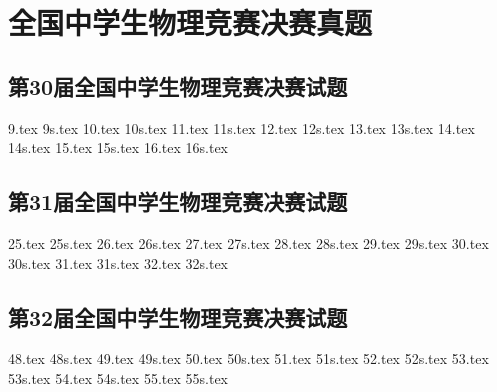\chapter{全国中学生物理竞赛决赛真题}
\section{第30届全国中学生物理竞赛决赛试题}
{9.tex}
{9s.tex}
{10.tex}
{10s.tex}
{11.tex}
{11s.tex}
{12.tex}
{12s.tex}
{13.tex}
{13s.tex}
{14.tex}
{14s.tex}
{15.tex}
{15s.tex}
{16.tex}
{16s.tex}
\newpage
\section{第31届全国中学生物理竞赛决赛试题}
{25.tex}
{25s.tex}
{26.tex}
{26s.tex}
{27.tex}
{27s.tex}
{28.tex}
{28s.tex}
{29.tex}
{29s.tex}
{30.tex}
{30s.tex}
{31.tex}
{31s.tex}
{32.tex}
{32s.tex}
\newpage
\section{第32届全国中学生物理竞赛决赛试题}
{48.tex}
{48s.tex}
{49.tex}
{49s.tex}
{50.tex}
{50s.tex}
{51.tex}
{51s.tex}
{52.tex}
{52s.tex}
{53.tex}
{53s.tex}
{54.tex}
{54s.tex}
{55.tex}
{55s.tex}
